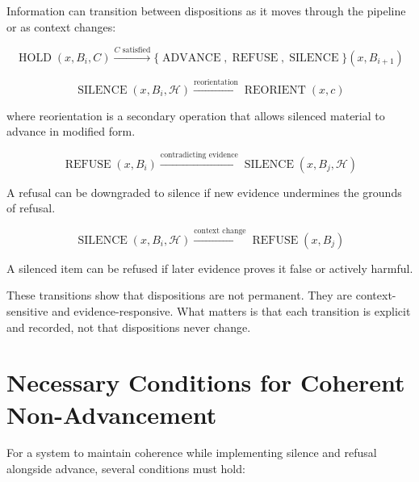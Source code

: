 \documentclass[12pt]{article}
\begin{document}
Information can transition between dispositions as it moves through the pipeline or as context changes:

\begin{equation}
\operatorname{HOLD}(x, B_i, C) \xrightarrow{C \text{ satisfied}} \{\operatorname{ADVANCE}, \operatorname{REFUSE}, \operatorname{SILENCE}\}(x, B_{i+1})
\end{equation}

\begin{equation}
\operatorname{SILENCE}(x, B_i, \mathcal{H}) \xrightarrow{\text{reorientation}} \operatorname{REORIENT}(x, c)
\end{equation}

where reorientation is a secondary operation that allows silenced material to advance in modified form.

\begin{equation}
\operatorname{REFUSE}(x, B_i) \xrightarrow{\text{contradicting evidence}} \operatorname{SILENCE}(x, B_j, \mathcal{H})
\end{equation}

A refusal can be downgraded to silence if new evidence undermines the grounds of refusal.

\begin{equation}
\operatorname{SILENCE}(x, B_i, \mathcal{H}) \xrightarrow{\text{context change}} \operatorname{REFUSE}(x, B_j)
\end{equation}

A silenced item can be refused if later evidence proves it false or actively harmful.

These transitions show that dispositions are not permanent. They are context-sensitive and evidence-responsive. What matters is that each transition is explicit and recorded, not that dispositions never change.

\section{Necessary Conditions for Coherent Non-Advancement}

For a system to maintain coherence while implementing silence and refusal alongside advance, several conditions must hold:
\end{document}
